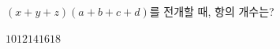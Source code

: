 \hspace*{2mm}\begin{minipage}[t]{\dimexpr\linewidth-2mm\relax}\vspace{0pt}
$(x+y+z)(a+b+c+d)$를 전개할 때, 항의 개수는?
\begin{choices32}{$10$}{$12$}{$14$}{$16$}{$18$}\end{choices32}\end{minipage}
